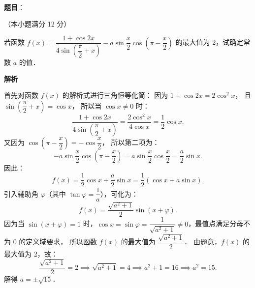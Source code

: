 \begin{answer}

\textbf{题目}：

（本小题满分 12 分）

若函数 $f(x) = \dfrac{1 + \cos 2x}{4\sin\left(\dfrac{\pi}{2} + x\right)} - a \sin\dfrac{x}{2} \cos\left(\pi - \dfrac{x}{2}\right)$ 的最大值为 2，试确定常数 $a$ 的值．

\textbf{解析}

首先对函数 $f(x)$ 的解析式进行三角恒等化简：
因为 $1 + \cos 2x = 2\cos^2 x$，
且 $\sin\left(\dfrac{\pi}{2} + x\right) = \cos x$，
所以当 $\cos x \neq 0$ 时：
\nopagebreak[4]
\[
\frac{1 + \cos 2x}{4\sin\left(\dfrac{\pi}{2} + x\right)} = \frac{2\cos^2 x}{4\cos x} = \frac{1}{2}\cos x.
\]
又因为 $\cos\left(\pi - \dfrac{x}{2}\right) = -\cos\dfrac{x}{2}$，
所以第二项为：
\nopagebreak[4]
\[
-a \sin\frac{x}{2} \cos\left(\pi - \frac{x}{2}\right) = a \sin\frac{x}{2}\cos\frac{x}{2} = \frac{a}{2}\sin x.
\]
因此：
\nopagebreak[4]
\[
f(x) = \frac{1}{2}\cos x + \frac{a}{2}\sin x = \frac{1}{2}(\cos x + a \sin x).
\]
引入辅助角 $\varphi$（其中 $\tan\varphi = \dfrac{1}{a}$），可化为：
\nopagebreak[4]
\[
f(x) = \frac{\sqrt{a^2 + 1}}{2} \sin(x + \varphi).
\]
因为当 $\sin(x + \varphi) = 1$ 时，$\cos x = \sin\varphi = \dfrac{1}{\sqrt{a^2 + 1}} \neq 0$，最值点满足分母不为 0 的定义域要求，
所以函数 $f(x)$ 的最大值为 $\dfrac{\sqrt{a^2 + 1}}{2}$．
由题意，$f(x)$ 的最大值为 2，故：
\nopagebreak[4]
\[
\frac{\sqrt{a^2 + 1}}{2} = 2 \implies \sqrt{a^2 + 1} = 4 \implies a^2 + 1 = 16 \implies a^2 = 15.
\]
解得 $a = \pm\sqrt{15}$．


\end{answer}
